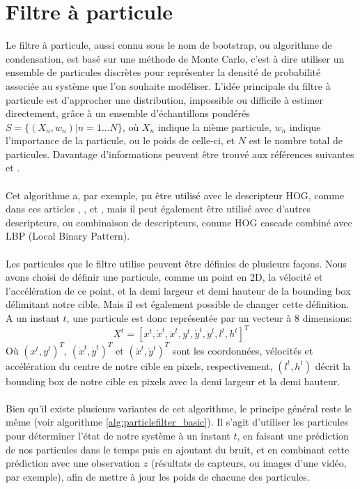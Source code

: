 \section{Filtre à particule}
Le filtre à particule, aussi connu sous le nom de bootstrap, ou algorithme de condensation, est basé sur une méthode de Monte Carlo, c'est à dire utiliser un ensemble de particules discrètes pour représenter la densité de probabilité associée au système que l'on souhaite modéliser. L'idée principale du filtre à particule est d'approcher une distribution, impossible ou difficile à estimer directement, grâce à un ensemble d'échantillons pondérés $S=\{(X_{n}, w_{n})|n=1...N\}$, où $X_{n}$ indique la nième particule, $w_{n}$ indique l'importance de la particule, ou le poids de celle-ci, et $N$ est le nombre total de particules. Davantage d'informations peuvent être trouvé aux références suivantes \cite{russell_norvig} et \cite{rlabbe}.\\
\\
Cet algorithme a, par exemple, pu être utilisé avec le descripteur HOG, comme dans ces articles \cite{xu_human_2010}, \cite{kong_particle_2019}, \cite{qiang_zhu_fast_2006} et \cite{dalal_histograms_2005}, mais il peut également être utilisé avec d'autres descripteurs, ou combinaison de descripteurs, comme HOG cascade combiné avec LBP (Local Binary Pattern).\\
\\
Les particules que le filtre utilise peuvent être définies de plusieurs façons. Nous avons choisi de définir une particule, comme un point en 2D, la vélocité et l'accélération de ce point, et la demi largeur et demi hauteur de la bounding box délimitant notre cible. Mais il est également possible de changer cette définition.\\
A un instant $t$, une particule est donc représentée par un vecteur à 8 dimensions:
$$X^{t}=\left[ x^{t}, \dot{x}^{t}, \ddot{x}^{t}, y^{t}, \dot{y}^{t}, \ddot{y}^{t}, l^{t}, h^{t} \right]^{T}$$
Où $(x^{t}, y^{t})^{T}$, $(\dot{x}^{t}, \dot{y}^{t})^{T}$ et $(\ddot{x}^{t}, \ddot{y}^{t})^{T}$ sont les coordonnées, vélocités et accélération du centre de notre cible en pixels, respectivement, $(l^{t}, h^{t})$ décrit la bounding box de notre cible en pixels avec la demi largeur et la demi hauteur.\\
\\
Bien qu'il existe plusieurs variantes de cet algorithme, le principe général reste le même (voir algorithme \ref{alg:particlefilter_basic}). Il s'agit d'utiliser les particules pour déterminer l'état de notre système à un instant $t$, en faisant une prédiction de nos particules dans le temps puis en ajoutant du bruit, et en combinant cette prédiction avec une observation $z$ (résultats de capteurs, ou images d'une vidéo, par exemple), afin de mettre à jour les poids de chacune des particules.\\
